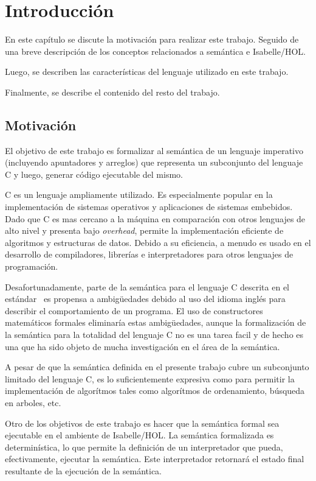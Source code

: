 \chapter{Introducción}\label{chapter:introduction}

En este capítulo se discute la motivación para realizar este trabajo.
Seguido de una breve descripción de los conceptos relacionados a semántica e Isabelle/HOL.

Luego, se describen las características del lenguaje utilizado en este trabajo.

Finalmente, se describe el contenido del resto del trabajo.

\section{Motivación}

El objetivo de este trabajo es formalizar al semántica de un lenguaje imperativo (incluyendo apuntadores y arreglos) que representa un subconjunto del lenguaje C y luego, generar código ejecutable del mismo.

C es un lenguaje ampliamente utilizado.
Es especialmente popular en la implementación de sistemas operativos y aplicaciones de sistemas embebidos.
Dado que C es mas cercano a la máquina en comparación con otros lenguajes de alto nivel y presenta bajo \textit{overhead}, permite la implementación eficiente de algoritmos y estructuras de datos.
Debido a su eficiencia, a menudo es usado en el desarrollo de compiladores, librerías e interpretadores para otros lenguajes de programación.

Desafortunadamente, parte de la semántica para el lenguaje C descrita en el estándar~\cite{c99} es propensa a ambigüedades debido al uso del idioma inglés para describir el comportamiento de un programa.
El uso de constructores matemáticos formales eliminaría estas ambigüedades, aunque la formalización de la semántica para la totalidad del lenguaje C no es una tarea facil y de hecho es una que ha sido objeto de mucha investigación en el área de la semántica.

A pesar de que la semántica definida en el presente trabajo cubre un subconjunto limitado del lenguaje C, es lo suficientemente expresiva como para permitir la implementación de algorítmos tales como algorítmos de ordenamiento, búsqueda en arboles, etc.

Otro de los objetivos de este trabajo es hacer que la semántica formal sea ejecutable en el ambiente de Isabelle/HOL.
La semántica formalizada es determinística, lo que permite la definición de un interpretador que pueda, efectivamente, ejecutar la semántica.
Este interpretador retornará el estado final resultante de la ejecución de la semántica.

